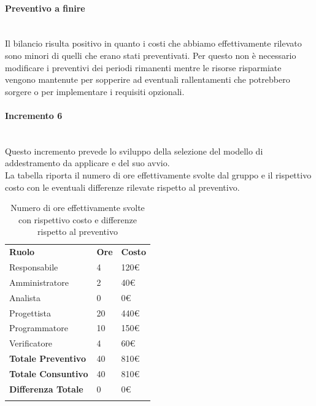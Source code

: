 \paragraph*{Preventivo a finire} \mbox{} \\
Il bilancio risulta positivo in quanto i costi che abbiamo effettivamente rilevato sono minori di quelli che erano stati preventivati. Per questo non è necessario modificare i preventivi dei periodi rimanenti mentre le risorse risparmiate vengono mantenute per sopperire ad eventuali rallentamenti che potrebbero sorgere o per implementare i requisiti opzionali.



\paragraph{Incremento 6}  \mbox{} \\
Questo incremento prevede lo sviluppo della selezione del modello di addestramento da applicare e del suo avvio. \\
La tabella riporta il numero di ore effettivamente svolte dal gruppo e il rispettivo costo con le eventuali differenze rilevate rispetto al preventivo.
\begin{longtable} {							
		>{}p{40mm}  
		>{}p{20mm}	
		>{}p{28mm}			
	}			
	\rowcolor{gray!50}
	
	\textbf{Ruolo}            & \textbf{Ore} & \textbf{Costo}       \TBstrut \\
	Responsabile              & 4            & 120\euro    \TBstrut \\
	Amministratore            & 2            & 40\euro              \TBstrut \\
	Analista                  & 0            & 0\euro               \TBstrut \\
	Progettista               & 20           & 440\euro             \TBstrut \\
	Programmatore             & 10           & 150\euro             \TBstrut \\
	Verificatore              & 4            & 60\euro              \TBstrut \\
	\textbf{Totale Preventivo}& 40           & 810\euro             \TBstrut \\	
	\textbf{Totale Consuntivo}& 40           & 810\euro             \TBstrut \\	
	\textbf{Differenza Totale}& 0            & 0\euro             \TBstrut \\
	\rowcolor{white}
	\caption{Numero di ore effettivamente svolte con rispettivo costo e differenze rispetto al preventivo}	
\end{longtable}

